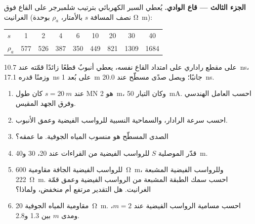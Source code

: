 \begin{problem}
\medskip\noindent\textbf{الجزء الثالث --- قاع الوادي.} يُعطي السبر الكهربائي بترتيب
شلمبرجر على القاع فوق الغرانيت (نصف المسافة $s$
بالأمتار، $\rho_a$ بوحدة \unit{\ohm\metre}):
\begin{center}
\small
\begin{tabular}{lcccccccc}
\hline
$s$ & 1 & 2 & 4 & 6 & 10 & 20 & 30 & 40 \\
$\rho_a$ & 577 & 526 & 387 & 350 & 449 & 821 & 1309 & 1684 \\
\hline
\end{tabular}
\end{center}
على مقطع راداري على امتداد القاع نفسه، يعطي أنبوبٌ قطعًا زائدًا قمّته
عند \qty{10.7}{ns}، وزمنًا قدره \qty{17.1}{ns} على بُعد \qty{1}{m}
جانبًا؛ ويصل صدًى مسطّح عند \qty{20.0}{ns}.
\begin{enumerate}[resume]
\item عند $s = \qty{20}{m}$ كان طول MN هو \qty{2}{m}، وكان التيار
  \qty{50}{mA}. احسب العامل الهندسي وفرق الجهد المقيس.
\item احسب سرعة الرادار، والسماحية النسبية للرواسب
  الفيضية وعمق الأنبوب.
\item الصدى المسطّح هو منسوب المياه الجوفية. ما عمقه؟
\item قدّر الموصلية $S$ للرواسب الفيضية من القراءات عند
  20، 30 و\qty{40}{m}.
\item للرواسب الفيضية الجافة مقاومية \qty{600}{\ohm\metre}، وللرواسب الفيضية
  المشبعة \qty{222}{\ohm\metre}. احسب سمك الطبقة المشبعة
  من الرواسب الفيضية وعمق قمّة الغرانيت. هل التقدير مرتفع
  أم منخفض، ولماذا؟
\item مقاومية المياه الجوفية \qty{20}{\ohm\metre}. احسب مسامية
  الرواسب الفيضية  عند $m = 2$، ومدى $m$
  بين \num{1.3} و\num{2.8}.
\end{enumerate}


\end{problem}
